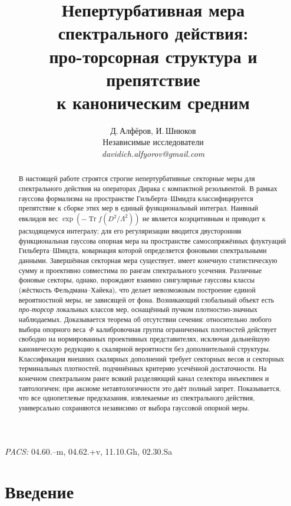 \documentclass[12pt,a4paper]{article}
\title{%
  \textbf{Непертурбативная мера спектрального действия:}\\[4pt]
  \textbf{про-торсорная структура и препятствие}\\[2pt]
  \textbf{к каноническим средним}
}
\author{Д.\,Алфёров, И.\,Шнюков\\[4pt]
\small Независимые исследователи\\[2pt]
\small\textit{davidich.alfyorov@gmail.com}}
\date{}
\theoremstyle{plain}
\theoremstyle{definition}
\theoremstyle{remark}
\newcommand{\Tr}{\operatorname{Tr}}
\newcommand{\Lam}{\Lambda}
\begin{document}
\maketitle

\begin{abstract}
В настоящей работе строятся строгие непертурбативные секторные меры
для спектрального действия на операторах Дирака с компактной резольвентой.
В рамках гауссова формализма на пространстве Гильберта--Шмидта
классифицируется препятствие к сборке этих мер в единый функциональный
интеграл.
Наивный евклидов вес $\exp(-\Tr f(D^2/\Lam^2))$ не является
коэрцитивным и приводит к расходящемуся интегралу; для его
регуляризации вводится двусторонняя функциональная гауссова опорная
мера на пространстве самосопряжённых флуктуаций Гильберта--Шмидта,
ковариация которой определяется фоновыми спектральными данными.
Завершённая секторная мера существует, имеет конечную статистическую
сумму и проективно совместима по рангам спектрального усечения.
Различные фоновые секторы, однако, порождают взаимно сингулярные
гауссовы классы (жёсткость Фельдмана--Хайека), что делает
невозможным построение единой вероятностной меры, не зависящей от
фона.  Возникающий глобальный объект есть \emph{про-торсор} локальных
классов мер, оснащённый пучком плотностно-значных наблюдаемых.
Доказывается теорема об отсутствии сечения: относительно любого
выбора опорного веса~$\Phi$ калибровочная группа ограниченных
плотностей действует свободно на нормированных проективных
представителях, исключая дальнейшую каноническую редукцию к
скалярной вероятности без дополнительной структуры.  Классификация
внешних скалярных дополнений требует секторных весов и секторных
терминальных плотностей, подчинённых критерию усечённой
достаточности.  На конечном спектральном ранге всякий разделяющий
канал селектора инъективен и тавтологичен; при аксиоме
нетавтологичности это даёт полный запрет.  Показывается, что все однопетлевые предсказания, извлекаемые из
спектрального действия, универсально сохраняются независимо от
выбора гауссовой опорной меры.
\end{abstract}

\noindent\textit{PACS:} 04.60.--m, 04.62.+v, 11.10.Gh, 02.30.Sa

\tableofcontents
\newpage

\section{Введение}
\label{sec:intro}
\end{document}
